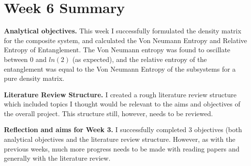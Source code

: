 \documentclass{article}
\begin{document}
\section*{Week 6 Summary}

\vspace{0.5cm}

\textbf{Analytical objectives.}
This week I successfully formulated the density matrix for the composite system, and calculated the Von Neumann Entropy and Relative Entropy of Entanglement. The Von Neumann entropy was found to oscillate between 0 and $ln(2)$ (as expected), and the relative entropy of the entanglement was equal to the Von Neumann Entropy of the subsystems for a pure density matrix. 

\vspace{0.5cm}

\textbf{Literature Review Structure.}
I created a rough literature review structure which included topics I thought would be relevant to the aims and objectives of the overall project. This structure still, however, needs to be reviewed. 

\vspace{0.5cm}

\textbf{Reflection and aims for Week 3.}
I successfully completed 3 objectives (both analytical objectives and the literature review structure. However, as with the previous weeks, much more progress needs to be made with reading papers and generally with the literature review.
\end{document}
